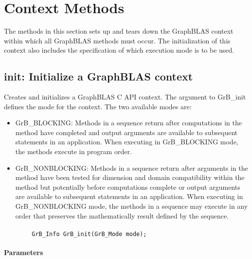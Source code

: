 \section{Context Methods}

The methods in this section sets up and tears down the GraphBLAS
context within which all GraphBLAS methods must occur.  The initialization
of this context also includes the specification of which execution mode is
to be used.

\subsection{{\sf init}: Initialize a GraphBLAS context}

Creates and initializes a GraphBLAS C API context.  The argument
to {\sf GrB\_init} defines the mode for the context.  The two
available modes are:

\begin{itemize}
\item {\sf GrB\_BLOCKING}: Methods in a sequence return after
computations in the method have completed and output arguments
are available to subsequent statements in an application.  When
executing in {\sf GrB\_BLOCKING} mode, the methods execute 
in program order.

\item {\sf GrB\_NONBLOCKING}: Methods in a sequence return after
arguments in the method have been tested for dimension and domain compatibility within the
method but potentially before computations complete or output 
arguments are available to subsequent statements in an application.
When executing in {\sf GrB\_NONBLOCKING} mode, the methods 
in a sequence may execute in any order that preserves the 
mathematically result defined by the sequence.

\end{itemize}

\paragraph{\syntax}

\begin{verbatim}
        GrB_Info GrB_init(GrB_Mode mode);
\end{verbatim}


\paragraph{Parameters}

